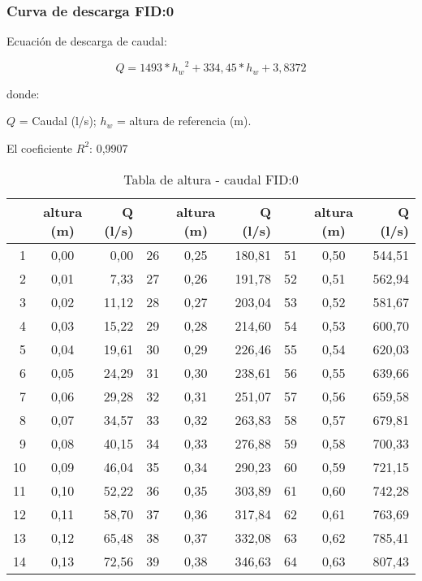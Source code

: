\documentclass[]{article}
\begin{document}
\subsubsection{Curva de descarga FID:0}\label{CD FID:0}

Ecuación de descarga de caudal:

\[Q = 1493* {{h_w}^2} + 334,45* h_w + 3,8372\]

donde:

\(Q\) = Caudal (l/s); \(h_w\) = altura de referencia (m).

El coeficiente \(R^2\): 0,9907


\begin{table}[H]

\caption{Tabla de altura - caudal FID:0}
\centering

\begin{center}
\begingroup\fontsize{10pt}{11pt}\selectfont
\begin{tabular}{rcrrcrrcr}
  \hline
 & altura (m) & Q (l/s) &  & altura (m) & Q (l/s) &  & altura (m) & Q (l/s) \\ 
  \hline
  1 & 0,00 & 0,00 &  26 & 0,25 & 180,81 &  51 & 0,50 & 544,51 \\ 
    2 & 0,01 & 7,33 &  27 & 0,26 & 191,78 &  52 & 0,51 & 562,94 \\ 
    3 & 0,02 & 11,12 &  28 & 0,27 & 203,04 &  53 & 0,52 & 581,67 \\ 
    4 & 0,03 & 15,22 &  29 & 0,28 & 214,60 &  54 & 0,53 & 600,70 \\ 
    5 & 0,04 & 19,61 &  30 & 0,29 & 226,46 &  55 & 0,54 & 620,03 \\ 
    6 & 0,05 & 24,29 &  31 & 0,30 & 238,61 &  56 & 0,55 & 639,66 \\ 
    7 & 0,06 & 29,28 &  32 & 0,31 & 251,07 &  57 & 0,56 & 659,58 \\ 
    8 & 0,07 & 34,57 &  33 & 0,32 & 263,83 &  58 & 0,57 & 679,81 \\ 
    9 & 0,08 & 40,15 &  34 & 0,33 & 276,88 &  59 & 0,58 & 700,33 \\ 
   10 & 0,09 & 46,04 &  35 & 0,34 & 290,23 &  60 & 0,59 & 721,15 \\ 
   11 & 0,10 & 52,22 &  36 & 0,35 & 303,89 &  61 & 0,60 & 742,28 \\ 
   12 & 0,11 & 58,70 &  37 & 0,36 & 317,84 &  62 & 0,61 & 763,69 \\ 
   13 & 0,12 & 65,48 &  38 & 0,37 & 332,08 &  63 & 0,62 & 785,41 \\ 
   14 & 0,13 & 72,56 &  39 & 0,38 & 346,63 &  64 & 0,63 & 807,43 \\ 

\end{tabular}
\end{center}
\end{table}
\end{document}
